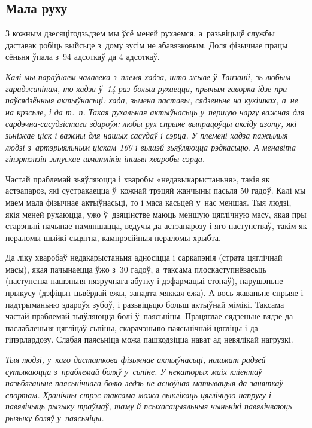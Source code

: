 
\subsection*{Мала руху}

З кожным дзесяцігодзьдзем мы ўсё меней рухаемся, а~разьвіцьцё службы даставак робіць выйсьце з~дому зусім не абавязковым. Доля фізычнае працы сёньня ўпала з~94 адсоткаў да 4 адсоткаў. 

\emph{Калі мы параўнаем чалавека з~племя хадза, што жыве ў~Танзаніі, зь любым гараджанінам, то хадза ў~14 раз больш рухаецца, прычым гаворка ідзе пра паўсядзённыя актыўнасьці: хада, зьмена паставы, сядзеньне на кукішках, а~не на крэсьле, і да т.~п. Такая рухальная актыўнасьць у~першую чаргу важная для сардэчна-сасудзістага здароўя: любы рух спрыяе выпрацоўцы аксіду азоту, які зьніжае ціск і важны для нашых сасудаў і сэрца. У племені хадза пажылыя людзі з~артэрыяльным ціскам 160 і вышэй зьяўляюцца рэдкасьцю. А менавіта гіпэртэнзія запускае шматлікія іншыя хваробы сэрца.}

Частай праблемай зьяўляюцца і хваробы «недавыкарыстаньня», такія як астэапароз, які сустракаецца ў~кожнай трэцяй жанчыны пасьля 50 гадоў. Калі мы маем мала фізычнае актыўнасьці, то і маса касьцей у~нас меншая. Тыя людзі, якія меней рухаюцца, ужо ў~дзяцінстве маюць меншую цяглічную масу, якая пры старэньні пачынае памяншацца, ведучы да астэапарозу і яго наступстваў, такім як пераломы шыйкі сьцягна, кампрэсійныя пераломы хрыбта.

Да ліку хваробаў недакарыстаньня адносіцца і саркапэнія (страта цяглічнай масы), якая пачынаецца ўжо з~30 гадоў, а~таксама плоскаступнёвасьць (наступства нашэньня нязручнага абутку і дэфармацыі стопаў), парушэньне прыкусу (дэфіцыт цьвёрдай ежы, занадта мяккая ежа). А вось жаваньне спрыяе і падтрыманьню здароўя зубоў, і разьвіцьцю больш актыўнай мімікі. Таксама частай праблемай зьяўляюцца болі ў~паясьніцы. Працяглае сядзеньне вядзе да паслабленьня цягліцаў сьпіны, скарачэньню паясьнічнай цягліцы і да гіпэрлардозу. Слабая паясьніца можа пашкодзіцца нават ад невялікай нагрузкі.

\emph{Тыя людзі, у~каго дастаткова фізычнае актыўнасьці, нашмат радзей сутыкаюцца з~праблемай боляў у~сьпіне. У некаторых маіх кліентаў пазьбяганьне паясьнічнага болю ледзь не асноўная матывацыя да заняткаў спортам. Хранічны стрэс таксама можа выклікаць цяглічную напругу і павялічыць рызыку траўмаў, таму й псыхасацыяльныя чыньнікі павялічваюць рызыку боляў у~паясьніцы.}


